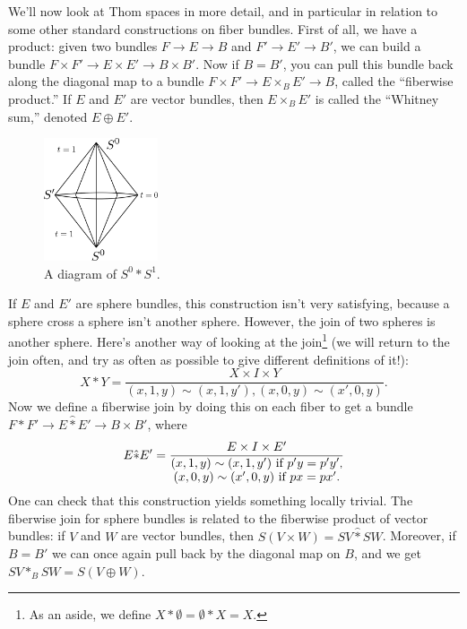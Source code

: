 \documentclass{article}
\begin{document}
We'll now look at Thom spaces in more detail, and in particular in relation to some other standard constructions on fiber bundles.  First of all, we have a product: given two bundles $F \to E \to B$ and $F' \to E' \to B'$, we can build a bundle $F \times F' \to E \times E' \to B \times B'$.  Now if $B = B'$, you can pull this bundle back along the diagonal map to a bundle $F \times F' \to E \times_B E' \to B$, called the ``fiberwise product.''  If $E$ and $E'$ are vector bundles, then $E \times_B E'$ is called the ``Whitney sum,'' denoted $E \oplus E'$.

\begin{figure} %
\centering\includegraphics[width=0.3\textwidth]{figures/fig9.pdf}
\caption{\small A diagram of $S^0 \ast S^1$.}
\end{figure}
If $E$ and $E'$ are sphere bundles, this construction isn't very satisfying, because a sphere cross a sphere isn't another sphere.  However, the join of two spheres is another sphere.  Here's another way of looking at the join\footnote{As an aside, we define $X \ast \emptyset = \emptyset \ast X = X$.} (we will return to the join often, and try as often as possible to give different definitions of it!):
\[
X \ast Y = \frac{X \times I \times Y}{(x, 1, y) \sim (x, 1, y'), (x, 0, y) \sim (x', 0, y)}.
\]
Now we define a fiberwise join by doing this on each fiber to get a bundle $F \ast F' \to E \hat \ast E' \to B \times B'$, where \[E \hat \ast E' = \frac{E \times I \times E'}{\substack{\hbox{$(x, 1, y) \sim (x, 1, y')$ if $p'y = p'y'$}, \\ \hbox{$(x, 0, y) \sim (x', 0, y)$ if $px = px'$.}}}\]  One can check that this construction yields something locally trivial.  The fiberwise join for sphere bundles is related to the fiberwise product of vector bundles: if $V$ and $W$ are vector bundles, then $S(V \times W) = SV \hat \ast SW$.  Moreover, if $B = B'$ we can once again pull back by the diagonal map on $B$, and we get $SV \ast_B SW = S(V \oplus W)$.
\end{document}
